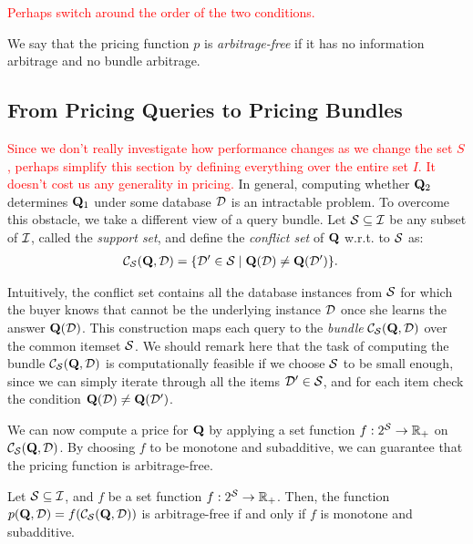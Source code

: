 \textcolor{red}{Perhaps switch around the order of the two conditions.}

We say that the pricing function $p$ is {\em arbitrage-free} if it has no information arbitrage and no bundle arbitrage. 

\subsection{From Pricing Queries to Pricing Bundles}

\textcolor{red}{Since we don't really investigate how performance changes as we change the set $S$, perhaps simplify this section by defining everything over the entire set $I$. It doesn't cost us any generality in pricing.}
In general, computing whether $\mathbf{Q}_2$ determines $\mathbf{Q}_1$ under some database $\mathcal{D}$ is an intractable problem. To overcome this obstacle, we take a different view of a query bundle. Let 
$\mathcal{S} \subseteq \mathcal{I}$ be any subset of $\mathcal{I}$, called the {\em support set}, and define the {\em conflict set} of $\mathbf{Q}$ w.r.t. to $\mathcal{S}$ as:
%
\begin{align*}
{\mathcal{C}}_{\mathcal{S}}(\mathbf{Q},\mathcal{D})  &= \{{\mathcal{D}' \in \mathcal{S}}\mid{\mathbf{Q}(\mathcal{D}) \neq \mathbf{Q}(\mathcal{D}')}\}. 
\end{align*}

Intuitively, the conflict set contains all the database instances from $\mathcal{S}$ for which the buyer knows that cannot be the underlying instance $\mathcal{D}$ once she learns the answer $\mathbf{Q}(\mathcal{D})$. This construction maps each query to the {\em  bundle} ${\mathcal{C}}_{\mathcal{S}}(\mathbf{Q},\mathcal{D}) $ over the common itemset $\mathcal{S}$. We should remark here that the task of computing the bundle ${\mathcal{C}}_{\mathcal{S}}(\mathbf{Q},\mathcal{D}) $ is computationally feasible if we choose $\mathcal{S}$ to be small enough, since we can simply iterate through all the items $\mathcal{D}' \in \mathcal{S}$, and for each item check the condition 
$\mathbf{Q}(\mathcal{D}) \neq \mathbf{Q}(\mathcal{D}')$.

We can now compute a price for $\mathbf{Q}$ by applying a set function $f: 2^{\mathcal{S}} \rightarrow  \mathbb{R}_+$ on ${\mathcal{C}}_{\mathcal{S}}(\mathbf{Q}, \mathcal{D})$. 
By choosing $f$ to be monotone and subadditive, we can guarantee that the pricing function is arbitrage-free.

\begin{theorem} \label{cor:arbitrage}
Let $\mathcal{S} \subseteq \mathcal{I}$, and $f$ be a set function $f: 2^{\mathcal{S}} \rightarrow  \mathbb{R}_+$. Then, the function $p(\mathbf{Q}, \mathcal{D}) = f({\mathcal{C}}_{\mathcal{S}}(\mathbf{Q}, \mathcal{D}))$ is arbitrage-free
if and only if  $f$ is monotone and subadditive. 
\end{theorem}

